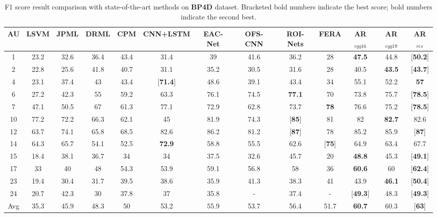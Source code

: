 \documentclass[5p,twocolumn]{elsarticle}
\begin{document}
\begin{table*}[htp]
	
	
	\scriptsize
	\setlength{\abovecaptionskip}{0pt} 
	
	\caption{F1 score result comparison with state-of-the-art methods on \textbf{BP4D} dataset. Bracketed bold numbers indicate the best score; bold numbers indicate the second best.}
	\label{tab:BP4D_F1}
	\centering
	\tabcolsep=0.1cm
	\begin{tabular}{c*{9}{c}ccc}
		\toprule
		AU & LSVM & JPML \cite{Zhao2016} & DRML \cite{Zhao2016b} & CPM \cite{zeng2015confidence} & CNN+LSTM \cite{Chu2017Learning} & EAC-Net \cite{li2017eac} & OFS-CNN \cite{han2017optimizing} & ROI-Nets \cite{li2017action} & FERA \cite{jaiswal2016deep} & AR$_{vgg16}$ & AR$_{vgg19}$ & AR$_{res}$ \\
		\midrule
1 & 23.2 & 32.6 & 36.4 & 43.4 & 31.4 & 39 & 41.6 & 36.2 & 28 & \textbf{47.5} & 44.8 & [\textbf{50.2}] \\
2 & 22.8 & 25.6 & 41.8 & 40.7 & 31.1 & 35.2 & 30.5 & 31.6 & 28 & 40.5 & \textbf{43.5} & [\textbf{43.7}] \\
4 & 23.1 & 37.4 & 43 & 43.4 & [\textbf{71.4}] & 48.6 & 39.1 & 43.4 & 34 & 55.1 & 52.2 & \textbf{57} \\
6 & 27.2 & 42.3 & 55 & 59.2 & 63.3 & 76.1 & 74.5 & \textbf{77.1} & 70 & 73.8 & 75.7 & [\textbf{78.5}] \\
7 & 47.1 & 50.5 & 67 & 61.3 & 77.1 & 72.9 & 62.8 & 73.7 & \textbf{78} & 76.6 & 75.2 & [\textbf{78.5}] \\
10 & 77.2 & 72.2 & 66.3 & 62.1 & 45 & 81.9 & 74.3 & [\textbf{85}] & 81 & 82 & \textbf{82.7} & 82.6 \\
12 & 63.7 & 74.1 & 65.8 & 68.5 & 82.6 & 86.2 & 81.2 & [\textbf{87}] & 78 & 85.2 & 85.9 & [\textbf{87}] \\
14 & 64.3 & 65.7 & 54.1 & 52.5 & \textbf{72.9} & 58.8 & 55.5 & 62.6 & [\textbf{75}] & 64.9 & 63.4 & 67.7 \\
15 & 18.4 & 38.1 & 36.7 & 34 & 34 & 37.5 & 32.6 & 45.7 & 20 & \textbf{48.8} & 45.3 & [\textbf{49.1}] \\
17 & 33 & 40 & 48 & 54.3 & 53.9 & 59.1 & 56.8 & 58 & 36 & \textbf{60.6} & 60 & [\textbf{62.4}] \\
23 & 19.4 & 30.4 & 31.7 & 39.5 & 38.6 & 35.9 & 41.3 & 38.3 & 41 & 43.9 & \textbf{46.1} & [\textbf{50.4}] \\
24 & 20.7 & 42.3 & 30 & 37.8 & 37 & 35.8 & - & 37.4 & - & [\textbf{49.3}] & 48.3 & [\textbf{49.3}] \\
\midrule
Avg & 35.3 & 45.9 & 48.3 & 50 & 53.2 & 55.9 & 53.7 & 56.4 & 51.7 & \textbf{60.7} & 60.3 & [\textbf{63}] \\
\bottomrule
	\end{tabular}
\end{table*}
\end{document}
